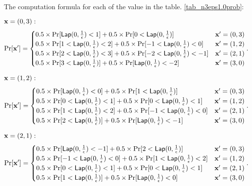 \documentclass{article}
\begin{document}
{The computation formula for each of the value in the table. \ref{tab_n3eps1.0prob}:

{\small

\noindent $\textbf{x} = (0,3):$
\[
\Pr[\dataobs']
= \begin{cases}
	0.5 \times 
 	\Pr[	\lap{0}{\frac{1}{\epsilon}}	<	1] 
 	+ 	
 	0.5 \times 
 	\Pr[	0	< \lap{0}{\frac{1}{\epsilon}}] 
%
	& \dataobs' = (0, 3)\\
%
 	0.5 \times 
 	\Pr[	1	< \lap{0}{\frac{1}{\epsilon}}	<	2] 
 	+ 	
 	0.5 \times 
 	\Pr[	-1	< \lap{0}{\frac{1}{\epsilon}}	<	0] 
%
	& \dataobs' = (1, 2)\\
%
 	0.5 \times 
 	\Pr[	2	<	\lap{0}{\frac{1}{\epsilon}}	<	3] 
 	+ 	
 	0.5 \times 
 	\Pr[	-2	< \lap{0}{\frac{1}{\epsilon}}	<	-1] 
%
	& \dataobs' = (2, 1)\\
%
 	0.5 \times 
 	\Pr[	3	<	\lap{0}{\frac{1}{\epsilon}}]
 	+ 	
 	0.5 \times 
 	\Pr[	\lap{0}{\frac{1}{\epsilon}}	<	-2] 
%
& \dataobs' = (3, 0)
\end{cases}.
\]


\noindent $\textbf{x} = (1,2):$
\[
\Pr[\dataobs']
= \begin{cases}
 	0.5 \times 
 	\Pr[	\lap{0}{\frac{1}{\epsilon}}	<	0] 
 	+ 	
 	0.5 \times 
 	\Pr[	1	< \lap{0}{\frac{1}{\epsilon}}] 
	& \dataobs' = (0, 3)\\
%
 	0.5 \times 
 	\Pr[	0	< \lap{0}{\frac{1}{\epsilon}}	<	1] 
 	+ 	
 	0.5 \times 
 	\Pr[	0	< \lap{0}{\frac{1}{\epsilon}}	<	1] 
	& \dataobs' = (1, 2)\\
%
 	0.5 \times 
 	\Pr[	1	<	\lap{0}{\frac{1}{\epsilon}}	<	2] 
 	+ 	
 	0.5 \times 
 	\Pr[	-1	< \lap{0}{\frac{1}{\epsilon}}	<	0] 
	& \dataobs' = (2, 1)\\
%
 	0.5 \times 
 	\Pr[	2	<	\lap{0}{\frac{1}{\epsilon}}] 
 	+ 	
 	0.5 \times 
 	\Pr[	\lap{0}{\frac{1}{\epsilon}}	<	-1] 
	& \dataobs' = (3, 0)
\end{cases}.
\]

\noindent $\textbf{x} = (2,1):$
\[
\Pr[\dataobs']
= \begin{cases}
 	0.5 \times 
 	\Pr[	\lap{0}{\frac{1}{\epsilon}}	<	-1]
 	+ 	
 	0.5 \times 
 	\Pr[	2	< \lap{0}{\frac{1}{\epsilon}}] 
%
	& \dataobs' = (0, 3)\\
%
 	0.5 \times 
 	\Pr[	-1	< \lap{0}{\frac{1}{\epsilon}}	<	0] 
 	+ 	
 	0.5 \times 
 	\Pr[	1	< \lap{0}{\frac{1}{\epsilon}}	<	2] 
%
	& \dataobs' = (1, 2)\\
%
 	0.5 \times 
 	\Pr[	0	<	\lap{0}{\frac{1}{\epsilon}}	<	1] 
 	+ 	
 	0.5 \times 
 	\Pr[	0	< \lap{0}{\frac{1}{\epsilon}}	<	1] 
%
& \dataobs' = (2, 1)\\
%
 	0.5 \times 
 	\Pr[	1	<	\lap{0}{\frac{1}{\epsilon}}	] 
 	+ 	
 	0.5 \times 
 	\Pr[	\lap{0}{\frac{1}{\epsilon}}	<	0] 
%
& \dataobs' = (3, 0)
\end{cases}.
\]



}}
\end{document}
